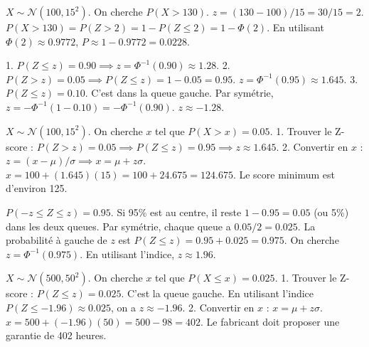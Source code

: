 \begin{correctionbox}
$X \sim \mathcal{N}(100, 15^2)$.
On cherche $P(X > 130)$.
$z = (130 - 100) / 15 = 30 / 15 = 2$.
$P(X > 130) = P(Z > 2) = 1 - P(Z \le 2) = 1 - \Phi(2)$.
En utilisant $\Phi(2) \approx 0.9772$, $P \approx 1 - 0.9772 = 0.0228$.
\end{correctionbox}


\begin{correctionbox}
1.  $P(Z \le z) = 0.90 \implies z = \Phi^{-1}(0.90) \approx 1.28$.
2.  $P(Z > z) = 0.05 \implies P(Z \le z) = 1 - 0.05 = 0.95$.
    $z = \Phi^{-1}(0.95) \approx 1.645$.
3.  $P(Z \le z) = 0.10$. C'est dans la queue gauche. Par symétrie, $z = - \Phi^{-1}(1 - 0.10) = - \Phi^{-1}(0.90)$.
    $z \approx -1.28$.
\end{correctionbox}

\begin{correctionbox}
$X \sim \mathcal{N}(100, 15^2)$. On cherche $x$ tel que $P(X > x) = 0.05$.
1.  Trouver le Z-score : $P(Z > z) = 0.05 \implies P(Z \le z) = 0.95 \implies z \approx 1.645$.
2.  Convertir en $x$ : $z = (x-\mu)/\sigma \implies x = \mu + z\sigma$.
    $x = 100 + (1.645)(15) = 100 + 24.675 = 124.675$.
    Le score minimum est d'environ 125.
\end{correctionbox}

\begin{correctionbox}
$P(-z \le Z \le z) = 0.95$.
Si 95\% est au centre, il reste $1 - 0.95 = 0.05$ (ou 5\%) dans les deux queues.
Par symétrie, chaque queue a $0.05 / 2 = 0.025$.
La probabilité à gauche de $z$ est $P(Z \le z) = 0.95 + 0.025 = 0.975$.
On cherche $z = \Phi^{-1}(0.975)$.
En utilisant l'indice, $z \approx 1.96$.
\end{correctionbox}

\begin{correctionbox}
$X \sim \mathcal{N}(500, 50^2)$. On cherche $x$ tel que $P(X \le x) = 0.025$.
1.  Trouver le Z-score : $P(Z \le z) = 0.025$. C'est la queue gauche.
    En utilisant l'indice $P(Z \le -1.96) \approx 0.025$, on a $z \approx -1.96$.
2.  Convertir en $x$ : $x = \mu + z\sigma$.
    $x = 500 + (-1.96)(50) = 500 - 98 = 402$.
    Le fabricant doit proposer une garantie de 402 heures.
\end{correctionbox}

